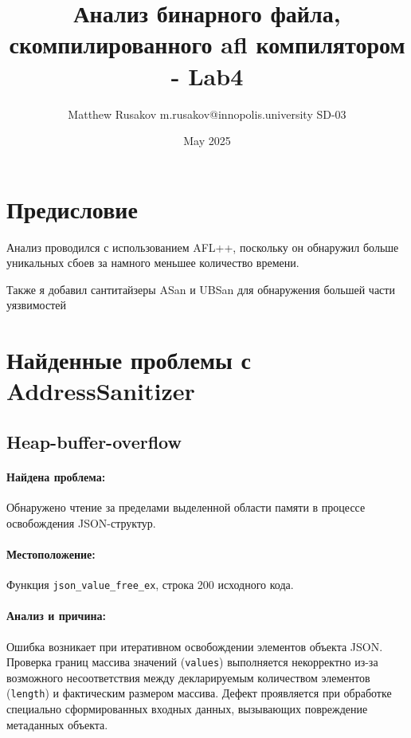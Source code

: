 \usepackage[russian]{babel}
\usepackage{geometry}
\usepackage{graphicx}
\usepackage{hyperref}
\usepackage{listings}
\usepackage{color}
\usepackage[T1]{fontenc}
\usepackage[utf8]{inputenc}

\title{Анализ бинарного файла, скомпилированного afl компилятором - Lab4}
\author{Matthew Rusakov m.rusakov@innopolis.university SD-03}
\date{May 2025}



\maketitle

\section{Предисловие}
Анализ проводился с использованием AFL++, поскольку он обнаружил больше уникальных сбоев за намного меньшее количество времени.

Также я добавил сантитайзеры ASan и UBSan для обнаружения большей части уязвимостей

\section{Найденные проблемы с AddressSanitizer}

\subsection{Heap-buffer-overflow}

\paragraph{Найдена проблема:}
Обнаружено чтение за пределами выделенной области памяти в процессе освобождения JSON-структур.

\paragraph{Местоположение:} Функция \texttt{json\_value\_free\_ex}, строка 200 исходного кода.

\paragraph{Анализ и причина:} Ошибка возникает при итеративном освобождении элементов объекта JSON. Проверка границ массива значений (\texttt{values}) выполняется некорректно из-за возможного несоответствия между декларируемым количеством элементов (\texttt{length}) и фактическим размером массива. Дефект проявляется при обработке специально сформированных входных данных, вызывающих повреждение метаданных объекта.

